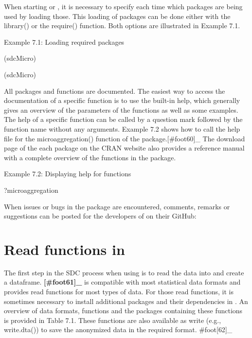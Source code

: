 \documentclass[letterpaper,10pt,english]{sphinxmanual}
\begin{document}
When starting  or , it is necessary to specify each time
which packages are being used by loading those. This loading of packages
can be done either with the library() or the require() function. Both
options are illustrated in Example 7.1.

Example 7.1: Loading required packages

(sdcMicro) 

(sdcMicro) 

All packages and functions are documented. The easiest way to access the
documentation of a specific function is to use the built-in help, which
generally gives an overview of the parameters of the functions as well
as some examples. The help of a specific function can be called by a
question mark followed by the function name without any arguments.
Example 7.2 shows how to call the help file for the microaggregation()
function of the  package.{[}\#foot60{]}\_ The download
page of the each package on the CRAN website also provides a reference
manual with a complete overview of the functions in the package.

Example 7.2: Displaying help for functions

?microaggregation 

When issues or bugs in the  package are encountered, comments,
remarks or suggestions can be posted for the developers of  on
their GitHub: 


\section{Read functions in }
\label{\detokenize{sdcMicro:read-functions-in-r}}
The first step in the SDC process when using  is to read the
data into  and create a dataframe. {\color{red}\bfseries{}{[}\#foot61{]}\_}  is
compatible with most statistical data formats and provides read
functions for most types of data. For those read functions, it is
sometimes necessary to install additional packages and their
dependencies in . An overview of data formats, functions and the
packages containing these functions is provided in Table 7.1. These
functions are also available as write (e.g., write.dta()) to save the
anonymized data in the required format. \#foot{[}62{]}\_
\end{document}

